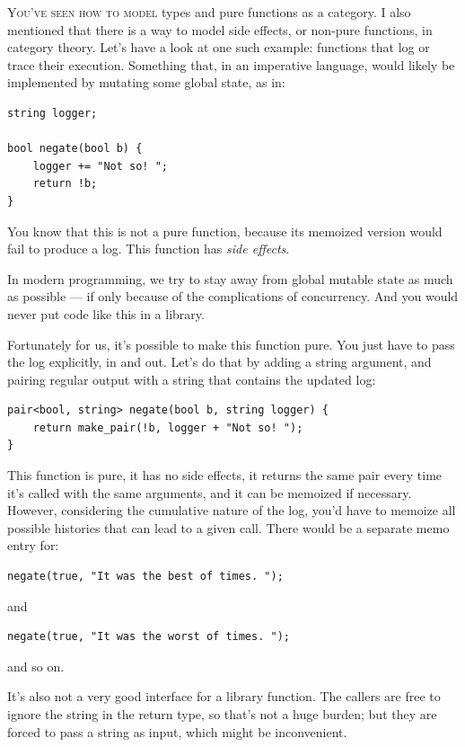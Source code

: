 \lettrine[lhang=0.17]{Y}{ou've seen how to model} types and pure functions as a category. I also
mentioned that there is a way to model side effects, or non-pure
functions, in category theory. Let's have a look at one such example:
functions that log or trace their execution. Something that, in an
imperative language, would likely be implemented by mutating some global
state, as in:

\begin{verbatim}
string logger;

bool negate(bool b) {
    logger += "Not so! ";
    return !b;
}
\end{verbatim}

You know that this is not a pure function, because its memoized version
would fail to produce a log. This function has \emph{side effects}.

In modern programming, we try to stay away from global mutable state as
much as possible --- if only because of the complications of
concurrency. And you would never put code like this in a library.

Fortunately for us, it's possible to make this function pure. You just
have to pass the log explicitly, in and out. Let's do that by adding a
string argument, and pairing regular output with a string that contains
the updated log:

\begin{verbatim}
pair<bool, string> negate(bool b, string logger) {
    return make_pair(!b, logger + "Not so! ");
}
\end{verbatim}

This function is pure, it has no side effects, it returns the same pair
every time it's called with the same arguments, and it can be memoized
if necessary. However, considering the cumulative nature of the log,
you'd have to memoize all possible histories that can lead to a given
call. There would be a separate memo entry for:

\begin{verbatim}
negate(true, "It was the best of times. ");
\end{verbatim}

and

\begin{verbatim}
negate(true, "It was the worst of times. ");
\end{verbatim}

and so on.

It's also not a very good interface for a library function. The callers
are free to ignore the string in the return type, so that's not a huge
burden; but they are forced to pass a string as input, which might be
inconvenient.

